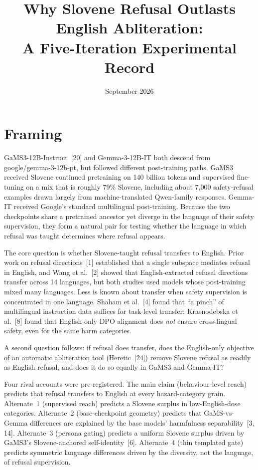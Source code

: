 \documentclass[11pt,letterpaper]{article}
\title{Why Slovene Refusal Outlasts English Abliteration:\\A Five-Iteration Experimental Record}
\date{September 2026}
\author{}
\begin{document}
\maketitle
\tableofcontents
\newpage

\section{Framing}

GaMS3-12B-Instruct~[20] and Gemma-3-12B-IT both descend from google/gemma-3-12b-pt, but followed different post-training paths. GaMS3 received Slovene continued pretraining on 140 billion tokens and supervised fine-tuning on a mix that is roughly 79\% Slovene, including about 7,000 safety-refusal examples drawn largely from machine-translated Qwen-family responses. Gemma-IT received Google's standard multilingual post-training. Because the two checkpoints share a pretrained ancestor yet diverge in the language of their safety supervision, they form a natural pair for testing whether the language in which refusal was taught determines where refusal appears.

The core question is whether Slovene-taught refusal transfers to English. Prior work on refusal directions~[1] established that a single subspace mediates refusal in English, and Wang et al.~[2] showed that English-extracted refusal directions transfer across 14 languages, but both studies used models whose post-training mixed many languages. Less is known about transfer when safety supervision is concentrated in one language. Shaham et al.~[4] found that ``a pinch'' of multilingual instruction data suffices for task-level transfer; Krasnodebska et al.~[8] found that English-only DPO alignment does \emph{not} ensure cross-lingual safety, even for the same harm categories.

A second question follows: if refusal does transfer, does the English-only objective of an automatic abliteration tool (Heretic~[24]) remove Slovene refusal as readily as English refusal, and does it do so equally in GaMS3 and Gemma-IT?

Four rival accounts were pre-registered. The main claim (behaviour-level reach) predicts that refusal transfers to English at every hazard-category grain. Alternate~1 (supervised reach) predicts a Slovene surplus in low-English-dose categories. Alternate~2 (base-checkpoint geometry) predicts that GaMS-vs-Gemma differences are explained by the base models' harmfulness separability~[3, 14]. Alternate~3 (persona gating) predicts a uniform Slovene surplus driven by GaMS3's Slovene-anchored self-identity~[6]. Alternate~4 (thin templated gate) predicts symmetric language differences driven by the diversity, not the language, of refusal supervision.
\end{document}
